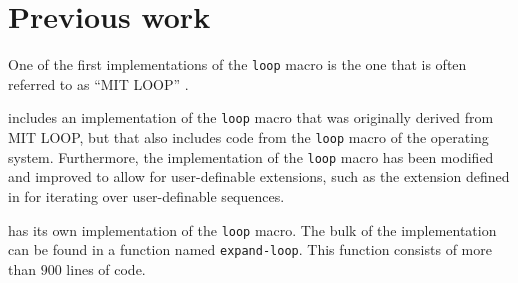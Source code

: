 \section{Previous work}

One of the first implementations of the \commonlisp{} \texttt{loop}
macro is the one that is often referred to as ``MIT LOOP''
\cite{Burke:Moon:MIT.loop}.

\sbcl{} includes an implementation of the \texttt{loop} macro that was
originally derived from MIT LOOP, but that also includes code from the
\texttt{loop} macro of the \genera{} operating system.  Furthermore,
the \sbcl{} implementation of the \texttt{loop} macro has been
modified and improved to allow for user-definable extensions, such as
the extension defined in \cite{Rhodes:2007:USC:1622123.1622138} for
iterating over user-definable sequences.

\clisp{} has its own implementation of the \texttt{loop} macro.  The
bulk of the implementation can be found in a function named
\texttt{expand-loop}.  This function consists of more than $900$ lines
of code.

